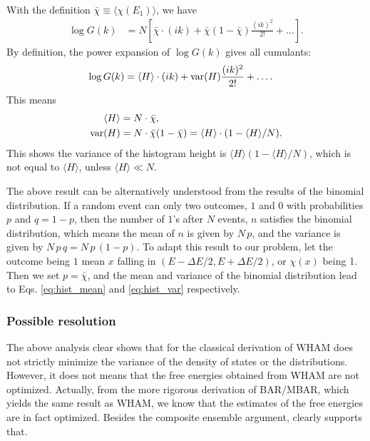 \documentclass[aip,jcp,preprint,notitlepage, superscriptaddress]{revtex4-1}
\begin{document}
With the definition $\bar\chi \equiv \langle \chi( E_1 ) \rangle$,
we have
%
\begin{align*}
\log G(k)
&=
N
\left[
  \bar\chi \cdot (i k)
+
  \bar\chi
  \left(
    1 - \bar\chi
  \right)
  \frac{ (i k)^2 } { 2! }
+ \dots
\right]
.
\end{align*}
%
By definition,
the power expansion of $\log G(k)$
gives all cumulants\cite{vankampen}:
\begin{align*}
\log G(k)
&=
 \langle H \rangle \cdot (i k)
+
\mathrm{var}(H)
\frac{ (i k)^2 } { 2! }
+ \dots
.
\end{align*}
%
This means
%
\begin{align}
\langle H \rangle
&=
N \cdot \bar\chi,
\label{eq:hist_mean} \\
\mathrm{var}( H )
&=
N \cdot \bar\chi (1 - \bar\chi)
=
\langle H \rangle \cdot ( 1 - \langle H \rangle /N).
\label{eq:hist_var}
\end{align}
%
This shows the variance of
the histogram height
is $\langle H \rangle (1 - \langle H \rangle/N)$,
which is not equal to $\langle H \rangle$,
unless $\langle H \rangle \ll N$.



The above result can be alternatively
understood from the results of the binomial distribution.
%
If a random event can only two outcomes, $1$ and $0$
with probabilities $p$ and $q = 1 - p$,
then the number of $1$'s after $N$ events, $n$
satisfies the binomial distribution,
which means the mean of $n$ is given by $N \, p$,
and the variance is given by
$N \, p \, q = N \, p \, (1 - p)$.
%
To adapt this result to our problem,
let the outcome being $1$ mean
$x$ falling in $(E - \Delta E/2, E + \Delta E/2)$,
or $\chi(x)$ being 1.
%
Then we set $p = \bar \chi$,
and the mean and variance of the binomial distribution
lead to Eqs. \eqref{eq:hist_mean} and \eqref{eq:hist_var}
respectively.





\subsubsection{Possible resolution}



The above analysis clear shows
that for the classical derivation of WHAM
does not strictly minimize the variance of
the density of states or the distributions.
%
However,
it does not means that
the free energies obtained from WHAM are not optimized.
%
Actually, from the more rigorous derivation of BAR/MBAR,
which yields the same result as WHAM,
we know that the estimates of the free energies
are in fact optimized.
%
Besides the composite ensemble argument,
clearly supports that.
\end{document}

